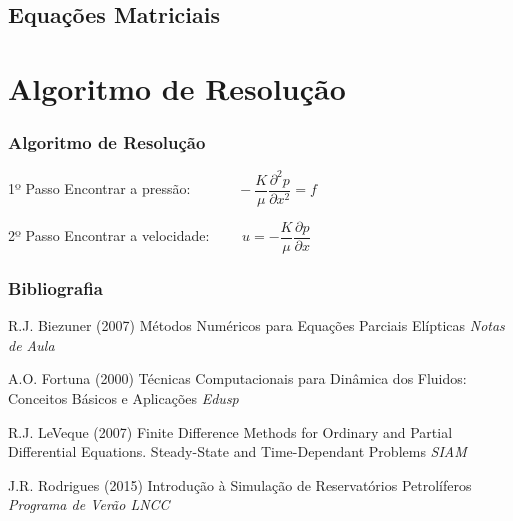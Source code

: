 \documentclass{beamer}
\begin{document}
\subsection{Equações Matriciais}
\begin{frame}
\end{frame}


\section{Algoritmo de Resolução}
\begin{frame}
\frametitle{Algoritmo de Resolução}
\begin{block}{1º Passo}
Encontrar a pressão: $\qquad \quad -\dfrac{K}{\mu}\dfrac{\partial^2 p}{\partial x^2}=f$
\end{block}

\begin{block}{2º Passo}
Encontrar a velocidade: $\qquad u=-\dfrac{K}{\mu}\dfrac{\partial p}{\partial x}$
\end{block}
\end{frame}

\begin{frame}
\frametitle{Bibliografia}
\footnotesize{
\begin{thebibliography}{99} %
 R.J. Biezuner (2007)
\newblock Métodos Numéricos para Equações Parciais Elípticas
\newblock \emph{Notas de Aula}

 A.O. Fortuna (2000)
\newblock Técnicas Computacionais para Dinâmica dos Fluidos: Conceitos Básicos e Aplicações
\newblock \emph{Edusp}

 R.J. LeVeque (2007)
\newblock Finite Difference Methods for Ordinary and Partial Differential Equations. Steady-State and Time-Dependant Problems
\newblock \emph{SIAM}

 J.R. Rodrigues (2015)
\newblock Introdução à Simulação de Reservatórios Petrolíferos
\newblock \emph{Programa de Verão LNCC}
\end{thebibliography}
}
\end{frame}
\end{document}
